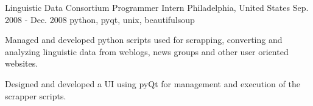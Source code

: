 \cventry
    {Linguistic Data Consortium} %
    {Programmer Intern} %
    {Philadelphia, United States} %
    {Sep. 2008 - Dec. 2008} %
    { python, pyqt, unix, beautifulsoup} %
    {
    \begin{cvitems} %
        \item { Managed and developed python scripts used for scrapping, converting and analyzing linguistic data from weblogs, news groups and other user oriented websites.}
        \item { Designed and developed a UI using pyQt for management and execution of the scrapper scripts.}
    \end{cvitems}
    }